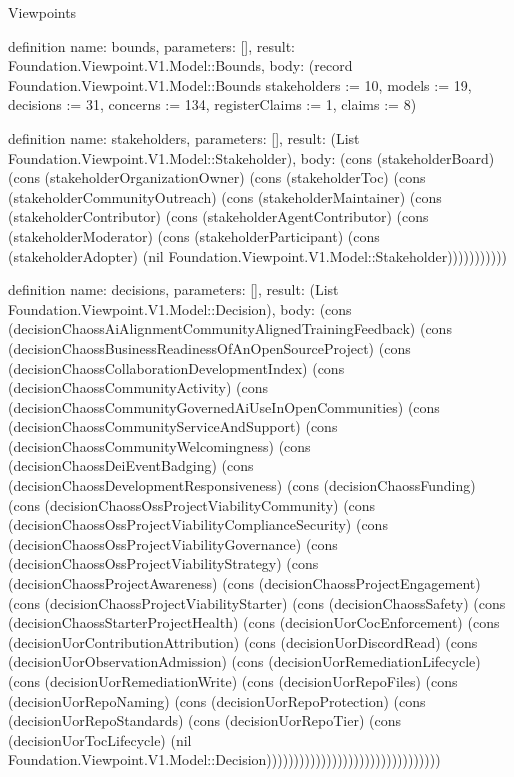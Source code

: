 \begin{lexlean}{Viewpoints}
\begin{semanticmodule}
definition{
  name: bounds,
  parameters: [],
  result: Foundation.Viewpoint.V1.Model::Bounds,
  body: (record Foundation.Viewpoint.V1.Model::Bounds {stakeholders := 10, models := 19, decisions := 31, concerns := 134, registerClaims := 1, claims := 8})
}

definition{
  name: stakeholders,
  parameters: [],
  result: (List Foundation.Viewpoint.V1.Model::Stakeholder),
  body: (cons (stakeholderBoard) (cons (stakeholderOrganizationOwner) (cons (stakeholderToc) (cons (stakeholderCommunityOutreach) (cons (stakeholderMaintainer) (cons (stakeholderContributor) (cons (stakeholderAgentContributor) (cons (stakeholderModerator) (cons (stakeholderParticipant) (cons (stakeholderAdopter) (nil Foundation.Viewpoint.V1.Model::Stakeholder)))))))))))
}

definition{
  name: decisions,
  parameters: [],
  result: (List Foundation.Viewpoint.V1.Model::Decision),
  body: (cons (decisionChaossAiAlignmentCommunityAlignedTrainingFeedback) (cons (decisionChaossBusinessReadinessOfAnOpenSourceProject) (cons (decisionChaossCollaborationDevelopmentIndex) (cons (decisionChaossCommunityActivity) (cons (decisionChaossCommunityGovernedAiUseInOpenCommunities) (cons (decisionChaossCommunityServiceAndSupport) (cons (decisionChaossCommunityWelcomingness) (cons (decisionChaossDeiEventBadging) (cons (decisionChaossDevelopmentResponsiveness) (cons (decisionChaossFunding) (cons (decisionChaossOssProjectViabilityCommunity) (cons (decisionChaossOssProjectViabilityComplianceSecurity) (cons (decisionChaossOssProjectViabilityGovernance) (cons (decisionChaossOssProjectViabilityStrategy) (cons (decisionChaossProjectAwareness) (cons (decisionChaossProjectEngagement) (cons (decisionChaossProjectViabilityStarter) (cons (decisionChaossSafety) (cons (decisionChaossStarterProjectHealth) (cons (decisionUorCocEnforcement) (cons (decisionUorContributionAttribution) (cons (decisionUorDiscordRead) (cons (decisionUorObservationAdmission) (cons (decisionUorRemediationLifecycle) (cons (decisionUorRemediationWrite) (cons (decisionUorRepoFiles) (cons (decisionUorRepoNaming) (cons (decisionUorRepoProtection) (cons (decisionUorRepoStandards) (cons (decisionUorRepoTier) (cons (decisionUorTocLifecycle) (nil Foundation.Viewpoint.V1.Model::Decision))))))))))))))))))))))))))))))))
}


\end{semanticmodule}
\end{lexlean}
